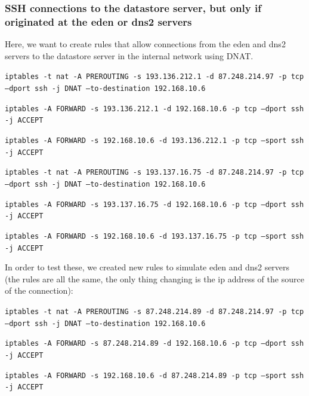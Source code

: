 \documentclass{article}
\begin{document}
\subsubsection{SSH connections to the datastore server, but only if originated at the eden or dns2 servers}
\texttt{}\par Here, we want to create rules that allow connections from the eden and dns2 servers to the datastore server in the internal network using DNAT.

\texttt{}\par
\texttt{iptables -t nat -A PREROUTING -s 193.136.212.1 -d 87.248.214.97 -p tcp --dport ssh -j DNAT --to-destination 192.168.10.6}\par
\texttt{iptables -A FORWARD -s 193.136.212.1 -d 192.168.10.6 -p tcp --dport ssh -j ACCEPT}\par
\texttt{iptables -A FORWARD -s 192.168.10.6 -d 193.136.212.1 -p tcp --sport ssh -j ACCEPT}\par
\texttt{iptables -t nat -A PREROUTING -s 193.137.16.75 -d 87.248.214.97 -p tcp --dport ssh -j DNAT --to-destination 192.168.10.6}\par
\texttt{iptables -A FORWARD -s 193.137.16.75 -d 192.168.10.6 -p tcp --dport ssh -j ACCEPT}\par
\texttt{iptables -A FORWARD -s 192.168.10.6 -d 193.137.16.75 -p tcp --sport ssh -j ACCEPT}\par
\texttt{}\par

In order to test these, we created new rules to simulate eden and dns2 servers (the rules are all the same, the only thing changing is the ip address of the source of the connection):\par
\texttt{}\par

\texttt{iptables -t nat -A PREROUTING -s 87.248.214.89 -d 87.248.214.97 -p tcp --dport ssh -j DNAT --to-destination 192.168.10.6}\par
\texttt{iptables -A FORWARD -s 87.248.214.89 -d 192.168.10.6 -p tcp --dport ssh -j ACCEPT}\par
\texttt{iptables -A FORWARD -s 192.168.10.6 -d 87.248.214.89 -p tcp --sport ssh -j ACCEPT}\par
\texttt{}\par
\end{document}
